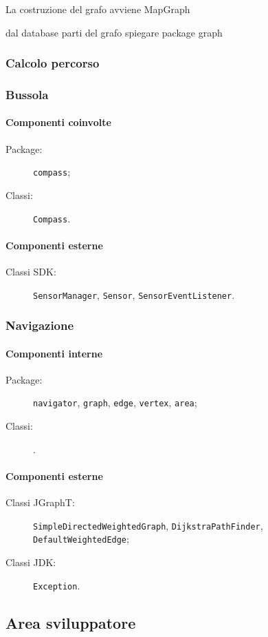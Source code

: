 \documentclass[../ManualeSviluppatore.tex]{subfiles}
\begin{document}
			La costruzione del grafo avviene 
				MapGraph
				
				
			dal database
			parti del grafo
			spiegare package graph
			
			
		
		\subsubsection{Calcolo percorso}
		
		\subsubsection{Bussola}
		
			\paragraph*{Componenti coinvolte}
			\begin{description}
				\item[Package:] \verb|compass|;
				\item[Classi:] \verb|Compass|.
			\end{description}

			\paragraph*{Componenti esterne}
			\begin{description}
				\item[Classi SDK:] \verb|SensorManager|, \verb|Sensor|, \verb|SensorEventListener|.
			\end{description}
			
			
			
		
		\subsubsection{Navigazione}
		
			\paragraph*{Componenti interne}
			\begin{description}
				\item[Package:] \verb|navigator|, \verb|graph|, \verb|edge|, \verb|vertex|, \verb|area|;
				\item[Classi:] \verb||.
			\end{description}
			
			\paragraph*{Componenti esterne}
			\begin{description}
				\item[Classi JGraphT:] \verb|SimpleDirectedWeightedGraph|, \verb|DijkstraPathFinder|, \verb|DefaultWeightedEdge|;
				\item[Classi JDK:] \verb|Exception|.
			\end{description}

			
	
	\subsection{Area sviluppatore}
\end{document}
